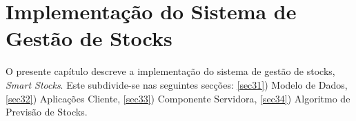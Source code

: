 %
%
\chapter{Implementação do Sistema de Gestão de Stocks} \label{cap3}

O presente capítulo descreve a implementação do sistema de gestão de stocks, \textit{Smart Stocks}. Este subdivide-se nas seguintes secções: \ref{sec31}) Modelo de Dados, \ref{sec32}) Aplicações Cliente, \ref{sec33}) Componente Servidora, \ref{sec34}) Algoritmo de Previsão de Stocks.





